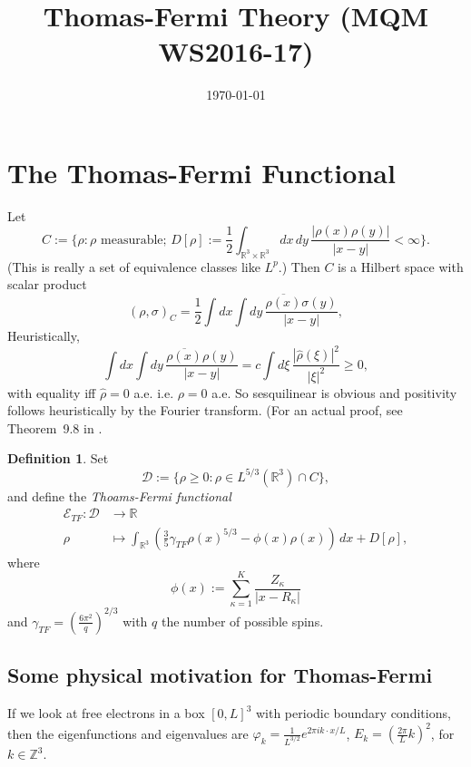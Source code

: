\documentclass[11pt]{amsart}
\newcommand{\Z}{\mathbb{Z}}
\newcommand{\R}{\mathbb{R}}
\renewcommand{\hat}{\widehat}
\theoremstyle{definition}
\theoremstyle{definition}
\newtheorem{defn}{Definition}
\theoremstyle{definition}
\numberwithin{equation}{section}
\begin{document}
\title[]{Thomas-Fermi Theory (MQM WS2016-17)}
\date{\today}

\maketitle

\section{The Thomas-Fermi Functional}
Let 
\[
C:=\{\rho:\rho\text{ measurable};\,D[\rho]:=\frac{1}{2}\int_{\R^3\times\R^3}dx\,dy\,\frac{|\rho(x)\rho(y)|}{|x-y|}<\infty\}.
\] 
(This is really a set of equivalence classes like $L^p$.) Then $C$ is a Hilbert space with scalar product
\begin{equation}
(\rho,\sigma)_C=\frac{1}{2}\int dx\int dy\,\frac{\overline{\rho(x)}\sigma(y)}{|x-y|},
\end{equation}
Heuristically,
\[
\int dx\int dy\,\frac{\overline{\rho(x)}\rho(y)}{|x-y|}=c\int d\xi\,\frac{|\hat{\rho}(\xi)|^2}{|\xi|^2}\ge0,
\]
with equality iff $\hat{\rho}=0$ a.e. i.e. $\rho=0$ a.e. So sesquilinear is obvious and positivity follows heuristically by the Fourier transform. (For an actual proof, see Theorem~9.8 in \cite{lieb-loss}.

\begin{defn}
Set
\begin{equation}
\mathcal{D}:=\{\rho\ge0:\rho\in L^{5/3}(\R^3)\cap C\},
\end{equation}
and define the \emph{Thoams-Fermi functional}
\begin{align}
\nonumber\mathcal{E}_{TF}:\mathcal{D}&\to\R\\
\rho&\mapsto\int_{\R^3}\left(\frac{3}{5}\gamma_{TF}\rho(x)^{5/3}-\phi(x)\rho(x)\right)\,dx+D[\rho],
\end{align}
where
\[
\phi(x):=\sum_{\kappa=1}^{K}\frac{Z_\kappa}{|x-R_\kappa|}
\]
and $\gamma_{TF}=\left(\frac{6\pi^2}{q}\right)^{2/3}$ with $q$ the number of possible spins.
\end{defn}

\subsection{Some physical motivation for Thomas-Fermi}

If we look at free electrons in a box $[0,L]^3$ with periodic boundary conditions, then the eigenfunctions and eigenvalues are $\varphi_k=\frac{1}{L^{3/2}}e^{2\pi ik\cdot x/L}$, $E_k=(\frac{2\pi}{L}k)^2$, for $k\in\Z^3$. 
\end{document}
